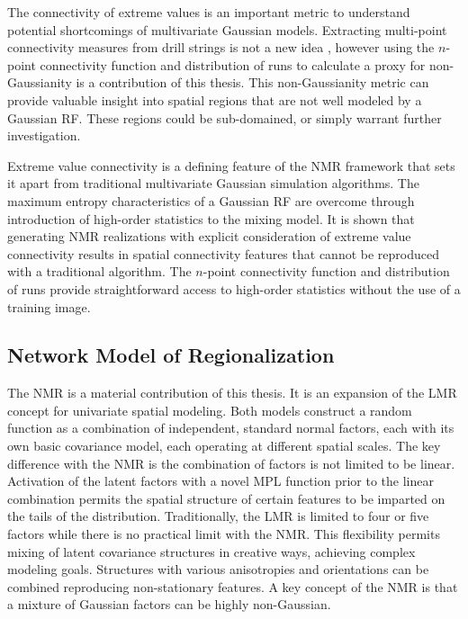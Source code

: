 The connectivity of extreme values is an important metric to understand potential shortcomings of multivariate Gaussian models. Extracting multi-point connectivity measures from drill strings is not a new idea \citep{ortiz2003characterization,boisvert2007multiplepoint}, however using the $n$-point connectivity function and distribution of runs to calculate a proxy for non-Gaussianity is a contribution of this thesis. This non-Gaussianity metric can provide valuable insight into spatial regions that are not well modeled by a Gaussian \gls{RF}. These regions could be sub-domained, or simply warrant further investigation.

Extreme value connectivity is a defining feature of the \gls{NMR} framework that sets it apart from traditional multivariate Gaussian simulation algorithms. The maximum entropy characteristics of a Gaussian \gls{RF} are overcome through introduction of high-order statistics to the mixing model. It is shown that generating \gls{NMR} realizations with explicit consideration of extreme value connectivity results in spatial connectivity features that cannot be reproduced with a traditional algorithm. The $n$-point connectivity function and distribution of runs provide straightforward access to high-order statistics without the use of a training image.

\subsection{Network Model of Regionalization}
\label{subsec:07nmr}

The \gls{NMR} is a material contribution of this thesis. It is an expansion of the \gls{LMR} concept for univariate spatial modeling. Both models construct a random function as a combination of independent, standard normal factors, each with its own basic covariance model, each operating at different spatial scales. The key difference with the \gls{NMR} is the combination of factors is not limited to be linear. Activation of the latent factors with a novel \gls{MPL} function prior to the linear combination permits the spatial structure of certain features to be imparted on the tails of the distribution. Traditionally, the \gls{LMR} is limited to four or five factors while there is no practical limit with the \gls{NMR}. This flexibility permits mixing of latent covariance structures in creative ways, achieving complex modeling goals. Structures with various anisotropies and orientations can be combined reproducing non-stationary features. A key concept of the \gls{NMR} is that a mixture of Gaussian factors can be highly non-Gaussian.

